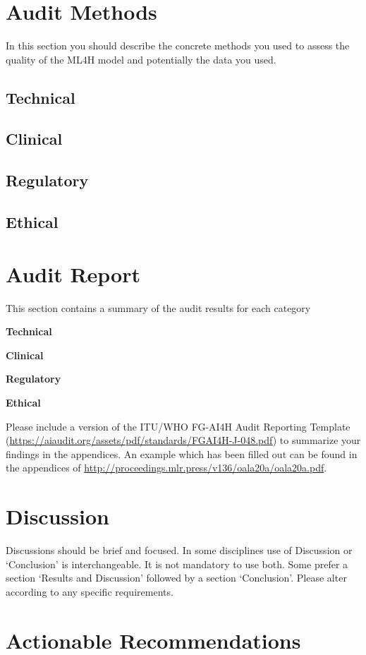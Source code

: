 \documentclass{article}
\begin{document}
\section{Audit Methods}\label{sec11}
In this section you should describe the concrete methods you used to assess the quality of the ML4H model and potentially the data you used.
\subsection{Technical}
\subsection{Clinical}
\subsection{Regulatory}
\subsection{Ethical}

\section{Audit Report}\label{sec111}
This section contains a summary of the audit results for each category

\textbf{Technical}

\textbf{Clinical}

\textbf{Regulatory}

\textbf{Ethical}

Please include a version of the ITU/WHO FG-AI4H Audit Reporting Template (\url{https://aiaudit.org/assets/pdf/standards/FGAI4H-J-048.pdf}) to summarize your findings in the appendices. An example which has been filled out can be found in the appendices of \url{http://proceedings.mlr.press/v136/oala20a/oala20a.pdf}.

\section{Discussion}\label{sec12}
Discussions should be brief and focused. In some disciplines use of Discussion or `Conclusion' is interchangeable. It is not mandatory to use both. Some prefer a section `Results and Discussion' followed by a section `Conclusion'. Please alter according to any specific requirements. 

\section{Actionable Recommendations}\label{sec13}
\end{document}
